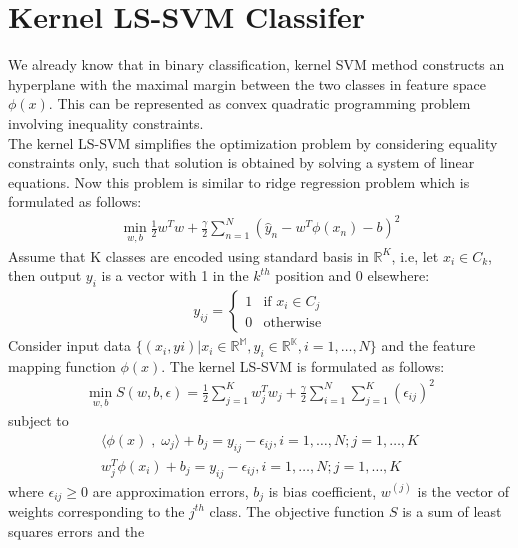 \documentclass[conference]{IEEEtran}
\begin{document}
    \section{Kernel LS-SVM Classifer}
    We already know that in binary classification, kernel SVM method constructs an hyperplane with the maximal margin
    between the two classes in feature space $ \phi(x) $.
    This can be represented as convex quadratic programming problem
    involving inequality constraints. \\
    The kernel LS-SVM simplifies the optimization problem by
    considering equality constraints only, such that solution is obtained by solving a system of linear equations.
    Now this problem is similar to ridge regression problem which is formulated as follows:
    \begin{align}
        \min_{w,b} \frac{1}{2}w^{T}w + \frac{\gamma}{2}\sum_{n=1}^{N}(\hat{y}_{n} - w^{T}\phi(x_{n}) - b)^{2}
    \end{align}
    Assume that K classes are encoded using standard basis in $\mathbb{R}^{K}$, i.e, let $x_{i} \in C_{k}$, then output
    $ y_{i}$ is a vector with 1 in the $k^{th}$ position and 0 elsewhere:
    \begin{align}
        y_{ij} = \begin{cases}
                     1 & \text{if } x_{i} \in C_{j} \\
                     0 & \text{otherwise}
        \end{cases}
    \end{align}
    Consider input data $\{(x_{i},y{i}) | x_{i}\in\mathbb{R^{M}},y_{i}\in\mathbb{R^{K}}, i = 1,\ldots,N\}$ and the
    feature mapping function $\phi(x)$. The kernel LS-SVM is formulated as follows:
    \begin{align}
        \min_{w,b} S(w,b,\epsilon) = \frac{1}{2}\sum_{j=1}^{K}w_{j}^{T}w_{j} + \frac{\gamma}{2}\sum_{i=1}^{N}\sum_{j=1}^{K}(\epsilon_{ij})^{2}
    \end{align}
    subject to
    \begin{align}
        \langle \phi(x) \;,\; \omega_{j}  \rangle + b_{j} = y_{ij} - \epsilon_{ij}, i = 1,\ldots,N; j = 1,\ldots,K \\
        w_{j}^{T}\phi(x_{i}) + b_{j} = y_{ij} - \epsilon_{ij} , i = 1,\ldots,N; j = 1,\ldots,K
    \end{align}
    where $\epsilon_{ij} \geq 0$ are approximation errors, $b_{j}$ is bias coefficient, $w^{(j)}$ is the vector of
    weights corresponding to the $j^{th}$ class. The objective function $S$ is a sum of least squares errors and the
\end{document}

